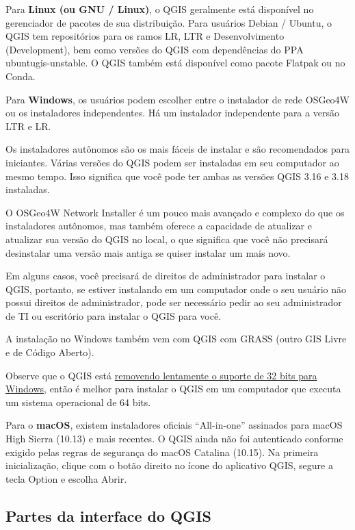 \documentclass[
  portuguese,
]{krantz}
\begin{document}
Para \textbf{Linux (ou GNU / Linux)}, o QGIS geralmente está disponível no gerenciador de pacotes de sua distribuição. Para usuários Debian / Ubuntu, o QGIS tem repositórios para os ramos LR, LTR e Desenvolvimento (Development), bem como versões do QGIS com dependências do PPA ubuntugis-unstable. O QGIS também está disponível como pacote Flatpak ou no Conda.

Para \textbf{Windows}, os usuários podem escolher entre o instalador de rede OSGeo4W ou os instaladores independentes. Há um instalador independente para a versão LTR e LR.

Os instaladores autônomos são os mais fáceis de instalar e são recomendados para iniciantes. Várias versões do QGIS podem ser instaladas em seu computador ao mesmo tempo. Isso significa que você pode ter ambas as versões QGIS 3.16 e 3.18 instaladas.

O OSGeo4W Network Installer é um pouco mais avançado e complexo do que os instaladores autônomos, mas também oferece a capacidade de atualizar e atualizar sua versão do QGIS no local, o que significa que você não precisará desinstalar uma versão mais antiga se quiser instalar um mais novo.

Em alguns casos, você precisará de direitos de administrador para instalar o QGIS, portanto, se estiver instalando em um computador onde o seu usuário não possui direitos de administrador, pode ser necessário pedir ao seu administrador de TI ou escritório para instalar o QGIS para você.

A instalação no Windows também vem com QGIS com GRASS (outro GIS Livre e de Código Aberto).

Observe que o QGIS está \href{https://blog.qgis.org/2020/10/15/phasing-out-32-bit-support-in-qgis/}{removendo lentamente o suporte de 32 bits para Windows}, então é melhor para instalar o QGIS em um computador que executa um sistema operacional de 64 bits.

Para o \textbf{macOS}, existem instaladores oficiais ``All-in-one'' assinados para macOS High Sierra (10.13) e mais recentes. O QGIS ainda não foi autenticado conforme exigido pelas regras de segurança do macOS Catalina (10.15). Na primeira inicialização, clique com o botão direito no ícone do aplicativo QGIS, segure a tecla Option e escolha Abrir.

\hypertarget{partes-da-interface-do-qgis}{%
\subsection{\texorpdfstring{\textbf{Partes da interface do QGIS}}{Partes da interface do QGIS}}\label{partes-da-interface-do-qgis}}
\end{document}
